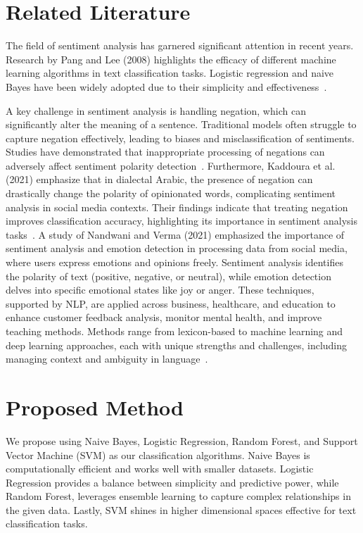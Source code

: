 \documentclass[runningheads]{llncs}
\begin{document}
\section{Related Literature}
The field of sentiment analysis has garnered significant attention in recent years. Research by 
Pang and Lee (2008) highlights the efficacy of different machine learning algorithms in text 
classification tasks. Logistic regression and naive Bayes have been widely adopted due to their 
simplicity and effectiveness~\cite{ref_article1}.

A key challenge in sentiment analysis is handling negation, which can significantly alter the 
meaning of a sentence. Traditional models often struggle to capture negation effectively, leading 
to biases and misclassification of sentiments. Studies have demonstrated that inappropriate processing 
of negations can adversely affect sentiment polarity detection~\cite{ref_article2}. Furthermore, 
Kaddoura et al. (2021) emphasize that in dialectal Arabic, the presence of negation can drastically 
change the polarity of opinionated words, complicating sentiment analysis in social media contexts. 
Their findings indicate that treating negation improves classification accuracy, highlighting its 
importance in sentiment analysis tasks~\cite{ref_article3}. 
A study of Nandwani and Verma (2021) emphasized the importance of sentiment analysis and emotion detection in processing data from social media, where users express emotions and opinions freely. Sentiment analysis identifies the polarity of text (positive, negative, or neutral), while emotion detection delves into specific emotional states like joy or anger. These techniques, supported by NLP, are applied across business, healthcare, and education to enhance customer feedback analysis, monitor mental health, and improve teaching methods. Methods range from lexicon-based to machine learning and deep learning approaches, each with unique strengths and challenges, including managing context and ambiguity in language~\cite{ref_article4}.

\section{Proposed Method}
We propose using Naive Bayes, Logistic Regression, Random Forest, and Support Vector Machine (SVM) as our classification algorithms. Naive Bayes is computationally efficient and works well with smaller datasets. Logistic Regression provides a balance between simplicity and predictive power, while Random Forest, leverages ensemble learning to capture complex relationships in the given data. Lastly, SVM shines in higher dimensional spaces effective for text classification tasks. \\
\end{document}
